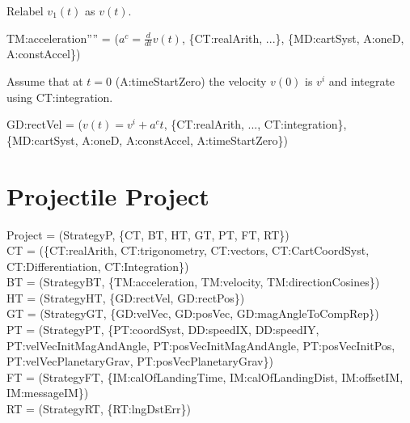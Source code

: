 \documentclass{article}
\begin{document}
\noindent Relabel $v_1(t)$ as $v(t)$.

TM:acceleration'''' = ($a^c = \frac{d}{dt} v(t)$, \{CT:realArith,
...\}, \{MD:cartSyst, A:oneD, A:constAccel\})

\noindent Assume that at $t = 0$ (A:timeStartZero) the velocity $v(0)$ is $v^i$
and integrate using CT:integration.

GD:rectVel = ($v(t) = v^i + a^c t$, \{CT:realArith, ...,
CT:integration\}, \{MD:cartSyst, A:oneD, A:constAccel, A:timeStartZero\})

\section{Projectile Project}

\noindent Project = (StrategyP, \{CT, BT, HT, GT, PT, FT, RT\})\\

\noindent CT = (\{CT:realArith, CT:trigonometry, CT:vectors, CT:CartCoordSyst,
CT:Differentiation, CT:Integration\})\\

\noindent BT = (StrategyBT, \{TM:acceleration, TM:velocity,
TM:directionCosines\})\\

\noindent HT = (StrategyHT, \{GD:rectVel, GD:rectPos\})\\

\noindent GT = (StrategyGT, \{GD:velVec, GD:posVec, GD:magAngleToCompRep\})\\

\noindent PT = (StrategyPT, \{PT:coordSyst, DD:speedIX, DD:speedIY,
PT:velVecInitMagAndAngle, PT:posVecInitMagAndAngle, PT:posVecInitPos,
PT:velVecPlanetaryGrav, PT:posVecPlanetaryGrav\})\\

\noindent FT = (StrategyFT, \{IM:calOfLandingTime, IM:calOfLandingDist,
IM:offsetIM, IM:messageIM\})\\

\noindent RT = (StrategyRT, \{RT:lngDstErr\})\\
\end{document}

